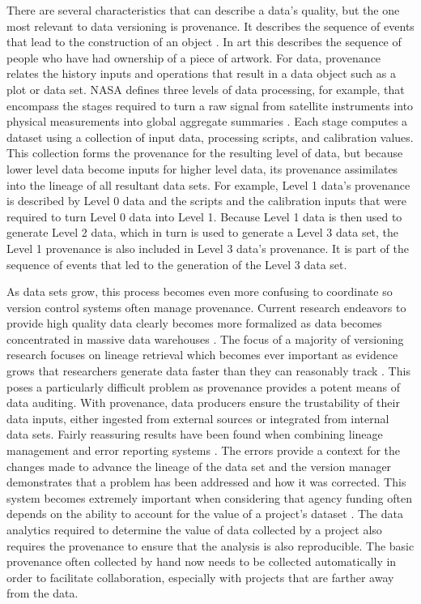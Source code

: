 There are several characteristics that can describe a data's quality, but the one most relevant to data versioning is provenance.
It describes the sequence of events that lead to the construction of an object  \cite{dai2014provenance}.
In art this describes the sequence of people who have had ownership of a piece of artwork.
For data, provenance relates the history inputs and operations that result in a data object such as a plot or data set.
NASA defines three levels of data processing, for example, that encompass the stages required to turn a raw signal from satellite instruments into physical measurements into global aggregate summaries \cite{Barkstrom2003}.
Each stage computes a dataset using a collection of input data, processing scripts, and calibration values.
This collection forms the provenance for the resulting level of data, but because lower level data become inputs for higher level data, its provenance assimilates into the lineage of all resultant data sets.
For example, Level 1 data's provenance is described by Level 0 data and the scripts and the calibration inputs that were required to turn Level 0 data into Level 1.
Because Level 1 data is then used to generate Level 2 data, which in turn is used to generate a Level 3 data set, the Level 1 provenance is also included in Level 3 data's provenance.
It is part of the sequence of events that led to the generation of the Level 3 data set.

As data sets grow, this process becomes even more confusing to coordinate so version control systems often manage provenance.
Current research endeavors to provide high quality data clearly becomes more formalized as data becomes concentrated in massive data warehouses \cite{Vassiliadis1999}.
The focus of a majority of versioning research focuses on lineage retrieval which becomes ever important as evidence grows that researchers generate data faster than they can reasonably track \cite{Bose:2005:LRS:1057977.1057978}.
This poses a particularly difficult problem as provenance provides a potent means of data auditing.
With provenance, data producers ensure the trustability of their data inputs, either ingested from external sources or integrated from internal data sets.
Fairly reassuring results have been found when combining lineage management and error reporting systems \cite{Fischer2003}.
The errors provide a context for the changes made to advance the lineage of the data set and the version manager demonstrates that a problem has been addressed and how it was corrected.
This system becomes extremely important when considering that agency funding often depends on the ability to account for the value of a project's dataset \cite{Cavanaugh2002}.
The data analytics required to determine the value of data collected by a project also requires the provenance to ensure that the analysis is also reproducible.
The basic provenance often collected by hand now needs to be collected automatically in order to facilitate collaboration, especially with projects that are farther away from the data.

